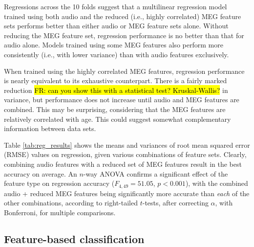 \documentclass[utf8]{frontiersSCNS} %
\newcommand{\FR}[1]{{\small \textcolor{red}{\hl{FR: #1}}}}
\begin{document}
Regressions across the 10 folds suggest that a multilinear regression model trained using both audio and the reduced (i.e., highly correlated) MEG feature sets performs better than either audio or MEG feature sets alone. Without  reducing the MEG feature set, regression performance is no better than that for audio alone. Models trained using some MEG features also  perform more consistently (i.e., with lower variance) than with audio features exclusively.

When trained using the highly correlated MEG features, regression performance is nearly equivalent to its exhaustive counterpart. There is a fairly marked reduction \FR{can you show this with a statistical test? Kruskal-Wallis?} in variance, but performance does not increase until audio and MEG features are combined. This may be surprising, considering that the MEG features are relatively correlated with age. This could suggest somewhat complementary information between data sets. %

Table \ref{tab:reg_results} shows the means and variances of root mean squared error (RMSE) values on regression, given various combinations of feature sets. Clearly, combining audio features with a reduced set of MEG features result in the best accuracy on average. An $n$-way ANOVA confirms a significant effect of the feature type on regression accuracy ($F_{4,49} = 51.05$, $p<0.001$), with the combined audio + reduced MEG features being significantly more accurate than {\em each} of the other combinations, according to right-tailed $t$-tests, after correcting $\alpha$, with Bonferroni, for multiple comparisons.

\subsection{Feature-based classification}
\end{document}
